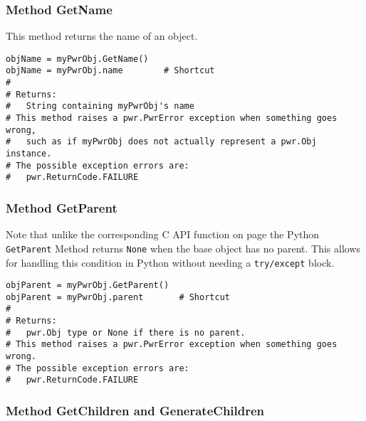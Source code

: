 \subsubsection{Method GetName} \label{meth:GetName}

This method returns the name of an object.

\begin{center}\begin{minipage}{.95\linewidth}\begin{lstlisting}
objName = myPwrObj.GetName()
objName = myPwrObj.name        # Shortcut
#
# Returns:
#   String containing myPwrObj's name
# This method raises a pwr.PwrError exception when something goes wrong,
#   such as if myPwrObj does not actually represent a pwr.Obj instance.
# The possible exception errors are:
#   pwr.ReturnCode.FAILURE
\end{lstlisting}\end{minipage}\end{center}

\subsubsection{Method GetParent} \label{meth:GetParent}

Note that unlike the corresponding C API function on page
\pageref{func:ObjGetParent} the Python \texttt{GetParent} Method returns \texttt{None}
when the base object has no parent. This allows for handling this condition in
Python without needing a \texttt{try/except} block.

\begin{center}\begin{minipage}{.95\linewidth}\begin{lstlisting}
objParent = myPwrObj.GetParent()
objParent = myPwrObj.parent       # Shortcut
#
# Returns:
#   pwr.Obj type or None if there is no parent.
# This method raises a pwr.PwrError exception when something goes wrong.
# The possible exception errors are:
#   pwr.ReturnCode.FAILURE
\end{lstlisting}\end{minipage}\end{center}

\subsubsection{Method GetChildren and GenerateChildren} \label{meth:GetChildren}

